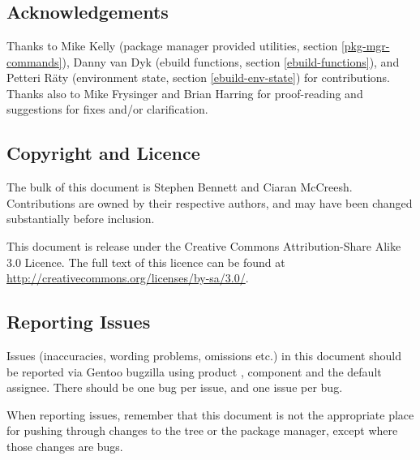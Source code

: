 \chapter*{}

\section*{Acknowledgements}

Thanks to Mike Kelly (package manager provided utilities, section \ref{pkg-mgr-commands}),
Danny van Dyk (ebuild functions, section \ref{ebuild-functions}), and
Petteri R\"aty (environment state, section \ref{ebuild-env-state}) for contributions. Thanks also to
Mike Frysinger and Brian Harring for proof-reading and suggestions for fixes and/or clarification.

\section*{Copyright and Licence}

The bulk of this document is  Stephen Bennett and Ciaran McCreesh. Contributions
are owned by their respective authors, and may have been changed substantially before inclusion.

This document is release under the Creative Commons Attribution-Share Alike 3.0 Licence. The full
text of this licence can be found at \url{http://creativecommons.org/licenses/by-sa/3.0/}.

\section*{Reporting Issues}

Issues (inaccuracies, wording problems, omissions etc.) in this document should be reported via
Gentoo bugzilla using product , component  and the default
assignee. There should be one bug per issue, and one issue per bug.

When reporting issues, remember that this document is not the appropriate place for pushing
through changes to the tree or the package manager, except where those changes are bugs.


